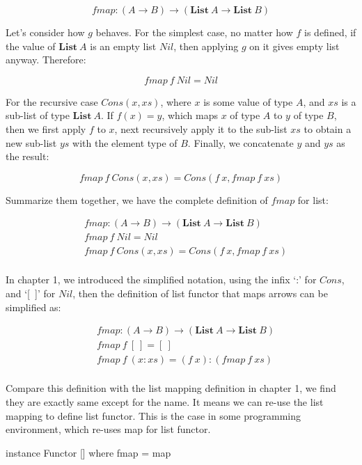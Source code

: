 \documentclass[b5paper]{article}
\begin{document}
\begin{example}
\[
fmap: (A \to B) \to (\mathbf{List}\ A \to \mathbf{List}\ B)
\]

Let's consider how $g$ behaves. For the simplest case, no matter how $f$ is defined, if the value of $\mathbf{List}\ A$ is an empty list $Nil$, then applying $g$ on it gives empty list anyway. Therefore:

\[
fmap\ f\ Nil = Nil
\]

For the recursive case $Cons(x, xs)$, where $x$ is some value of type $A$, and $xs$ is a sub-list of type $\mathbf{List}\ A$. If $f(x) = y$, which maps $x$ of type $A$ to $y$ of type $B$, then we first apply $f$ to $x$, next recursively apply it to the sub-list $xs$ to obtain a new sub-list $ys$ with the element type of $B$. Finally, we concatenate $y$ and $ys$ as the result:

\[
fmap\ f\ Cons(x, xs) = Cons(f\ x, fmap\ f\ xs)
\]

Summarize them together, we have the complete definition of $fmap$ for list:

\[
\begin{array}{l}
\quad    fmap : (A \to B) \to (\mathbf{List}\ A \to \mathbf{List}\ B) \\
\quad    fmap\ f\ Nil = Nil \\
\quad    fmap\ f\ Cons(x, xs) = Cons(f\ x, fmap\ f\ xs) \\
\end{array}
\]

In chapter 1, we introduced the simplified notation, using the infix `:' for $Cons$, and `[\ ]' for $Nil$, then the definition of list functor that maps arrows can be simplified as:

\[
\begin{array}{l}
\quad    fmap : (A \to B) \to (\mathbf{List}\ A \to \mathbf{List}\ B) \\
\quad    fmap\ f\ [\ ] = [\ ] \\
\quad    fmap\ f\ (x:xs) = (f\ x):(fmap\ f\ xs) \\
\end{array}
\]

Compare this definition with the list mapping definition in chapter 1, we find they are exactly same except for the name. It means we can re-use the list mapping to define list functor. This is the case in some programming environment, which re-uses map for list functor.

\lstset{frame=single}
\begin{Haskell}
instance Functor [] where
    fmap = map
\end{Haskell}


\end{example}
\end{document}
